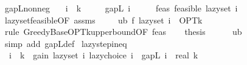 \begin{isabellebody}
\isanewline
%
\endisadelimproof
\isanewline
{}\isamarkupfalse%
\ gapL{\isacharunderscore}{\kern0pt}nonneg{\isacharcolon}{\kern0pt}\isanewline
\ \ \ {\isachardoublequoteopen}i\ {\isasymle}\ k{\isachardoublequoteclose}\isanewline
\ \ \ {\isachardoublequoteopen}{}\ {\isasymle}\ gapL\ i{\isachardoublequoteclose}\isanewline
%
\isadelimproof
%
\endisadelimproof
%
\isatagproof
{}\isamarkupfalse%
\ {\isacharminus}{\kern0pt}\isanewline
\ \ \isamarkupfalse%
\ feas{\isacharcolon}{\kern0pt}\ {\isachardoublequoteopen}feasible\ {\isacharparenleft}{\kern0pt}lazy{\isacharunderscore}{\kern0pt}set\ i{\isacharparenright}{\kern0pt}{\isachardoublequoteclose}\isanewline
\ \ \ \ \isamarkupfalse%
\ lazy{\isacharunderscore}{\kern0pt}set{\isacharunderscore}{\kern0pt}feasible{\isacharbrackleft}{\kern0pt}OF\ assms{\isacharbrackright}{\kern0pt}\ \isakeywordONE{{\isachardot}{\kern0pt}}\isamarkupfalse%
\isanewline
\ \ \isamarkupfalse%
\ ub{\isacharcolon}{\kern0pt}\ {\isachardoublequoteopen}f\ {\isacharparenleft}{\kern0pt}lazy{\isacharunderscore}{\kern0pt}set\ i{\isacharparenright}{\kern0pt}\ {\isasymle}\ OPT{\isacharunderscore}{\kern0pt}k{\isachardoublequoteclose}\isanewline
\ \ \ \ \isamarkupfalse%
\ {\isacharparenleft}{\kern0pt}rule\ Greedy{\isacharunderscore}{\kern0pt}Base{\isachardot}{\kern0pt}OPT{\isacharunderscore}{\kern0pt}k{\isacharunderscore}{\kern0pt}upper{\isacharunderscore}{\kern0pt}bound{\isacharbrackleft}{\kern0pt}OF\ feas{\isacharbrackright}{\kern0pt}{\isacharparenright}{\kern0pt}\isanewline
\ \ \isamarkupfalse%
\ {\isacharquery}{\kern0pt}thesis\isanewline
\ \ \ \ \isamarkupfalse%
\ ub\ \isamarkupfalse%
\ {\isacharparenleft}{\kern0pt}simp\ add{\isacharcolon}{\kern0pt}\ gapL{\isacharunderscore}{\kern0pt}def{\isacharparenright}{\kern0pt}\isanewline
{}\isamarkupfalse%
%
\endisatagproof
{\isafoldproof}%
%
\isadelimproof
\isanewline
%
\endisadelimproof
\isanewline
{}\isamarkupfalse%
\ lazy{\isacharunderscore}{\kern0pt}step{\isacharunderscore}{\kern0pt}ineq{\isacharcolon}{\kern0pt}\isanewline
\ \ {\isachardoublequoteopen}i\ {\isacharless}{\kern0pt}\ k\ {\isasymLongrightarrow}\ gain\ {\isacharparenleft}{\kern0pt}lazy{\isacharunderscore}{\kern0pt}set\ i{\isacharparenright}{\kern0pt}\ {\isacharparenleft}{\kern0pt}lazy{\isacharunderscore}{\kern0pt}choice\ i{\isacharparenright}{\kern0pt}\ {\isasymge}\ gapL\ i\ {\isacharslash}{\kern0pt}\ real\ k{\isachardoublequoteclose}\isanewline

\end{isabellebody}
